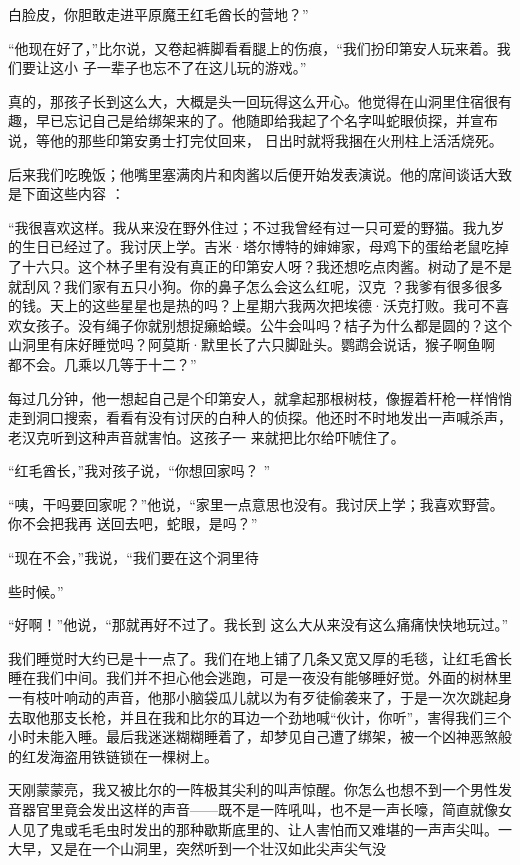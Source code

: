 \documentclass{article}
\begin{document}
\newpage
白脸皮，你胆敢走进平原魔王红毛酋长的营地？” 

“他现在好了，”比尔说，又卷起裤脚看看腿上的伤痕，“我们扮印第安人玩来着。我们要让这小
子一辈子也忘不了在这儿玩的游戏。” 

真的，那孩子长到这么大，大概是头一回玩得这么开心。他觉得在山洞里住宿很有趣，早已忘记自己是给绑架来的了。他随即给我起了个名字叫蛇眼侦探，并宣布说，等他的那些印第安勇士打完仗回来，
日出时就将我捆在火刑柱上活活烧死。 

后来我们吃晚饭；他嘴里塞满肉片和肉酱以后便开始发表演说。他的席间谈话大致是下面这些内容
： 

“我很喜欢这样。我从来没在野外住过；不过我曾经有过一只可爱的野猫。我九岁的生日已经过了。我讨厌上学。吉米·塔尔博特的婶婶家，母鸡下的蛋给老鼠吃掉了十六只。这个林子里有没有真正的印第安人呀？我还想吃点肉酱。树动了是不是就刮风？我们家有五只小狗。你的鼻子怎么会这么红呢，汉克
\newpage
？我爹有很多很多的钱。天上的这些星星也是热的吗？上星期六我两次把埃德·沃克打败。我可不喜欢女孩子。没有绳子你就别想捉癞蛤蟆。公牛会叫吗？桔子为什么都是圆的？这个山洞里有床好睡觉吗？阿莫斯·默里长了六只脚趾头。鹦鹉会说话，猴子啊鱼啊
都不会。几乘以几等于十二？” 

每过几分钟，他一想起自己是个印第安人，就拿起那根树枝，像握着杆枪一样悄悄走到洞口搜索，看看有没有讨厌的白种人的侦探。他还时不时地发出一声喊杀声，老汉克听到这种声音就害怕。这孩子一
来就把比尔给吓唬住了。 

“红毛酋长，”我对孩子说，“你想回家吗？
” 

“咦，干吗要回家呢？”他说，“家里一点意思也没有。我讨厌上学；我喜欢野营。你不会把我再
送回去吧，蛇眼，是吗？” 

“现在不会，”我说，“我们要在这个洞里待
\newpage

些时候。” 

“好啊！”他说，“那就再好不过了。我长到
这么大从来没有这么痛痛快快地玩过。” 

我们睡觉时大约已是十一点了。我们在地上铺了几条又宽又厚的毛毯，让红毛酋长睡在我们中间。我们并不担心他会逃跑，可是一夜没有能够睡好觉。外面的树林里一有枝叶响动的声音，他那小脑袋瓜儿就以为有歹徒偷袭来了，于是一次次跳起身去取他那支长枪，并且在我和比尔的耳边一个劲地喊“伙计，你听”，害得我们三个小时未能入睡。最后我迷迷糊糊睡着了，却梦见自己遭了绑架，被一个凶神恶煞般
的红发海盗用铁链锁在一棵树上。 

天刚蒙蒙亮，我又被比尔的一阵极其尖利的叫声惊醒。你怎么也想不到一个男性发音器官里竟会发出这样的声音——既不是一阵吼叫，也不是一声长嚎，简直就像女人见了鬼或毛毛虫时发出的那种歇斯底里的、让人害怕而又难堪的一声声尖叫。一大早，又是在一个山洞里，突然听到一个壮汉如此尖声尖气没
\newpage
\end{document}
